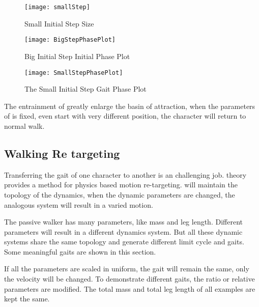 \begin{figure}[!htbp]
  \begin{center}
      \texttt{[image: smallStep]}
    \caption{Small Initial Step Size}
    \label{fig:smallStepini}
\end{center}
\end{figure}


\begin{figure}[!htbp]
  \begin{center}
      \texttt{[image: BigStepPhasePlot]}
    \caption{Big Initial Step Initial Phase Plot}
    \label{fig:bigstepiniGaitPlot}
\end{center}
\end{figure}


\begin{figure}[!htbp]
  \begin{center}
      \texttt{[image: SmallStepPhasePlot]}
    \caption{The Small Initial Step Gait Phase Plot}
    \label{fig:smallstepiniPhasePlot}
\end{center}
\end{figure}

The entrainment of \cpg greatly enlarge the basin of attraction, when the parameters of \cpg is fixed, even start with very different position, the character will return to normal walk.





\subsection{Walking Re targeting}
Transferring the gait of one character to another is an challenging job.
\moit theory provides a method for physics based motion re-targeting.
\cpg will maintain the topology of the dynamics, when the dynamic parameters are changed, the analogous system will result in a varied motion.

The passive walker has many parameters, like mass and leg length.
Different parameters will result in a different dynamics system.
But all these dynamic systems  share the same topology and generate different limit cycle and gaits.
Some meaningful gaits are shown in this section.

If all the parameters are scaled in uniform, the gait will remain the same, only the velocity will be changed.
To demonstrate different gaits, the ratio or relative parameters are modified. 
The total mass and total leg length of all examples are kept the same.



